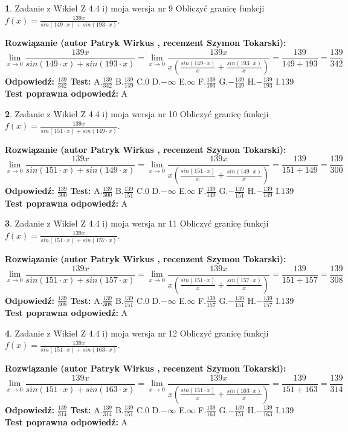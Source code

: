 \documentclass[12pt, a4paper]{article}
\theoremstyle{definition} %
\newtheorem{zad}{}
\newcommand{\zadStart}[1]{\begin{zad}#1\newline}
\newcommand{\zadStop}{\end{zad}}
\newcommand{\rozwStart}[2]{\noindent \textbf{Rozwiązanie (autor #1 , recenzent #2): }\newline}
\newcommand{\rozwStop}{\newline}
\newcommand{\odpStart}{\noindent \textbf{Odpowiedź:}\newline}
\newcommand{\odpStop}{\newline}
\newcommand{\testStart}{\noindent \textbf{Test:}\newline}
\newcommand{\testStop}{\newline}
\newcommand{\kluczStart}{\noindent \textbf{Test poprawna odpowiedź:}\newline}
\newcommand{\kluczStop}{\newline}
\begin{document}
\zadStart{Zadanie z Wikieł Z 4.4 i) moja wersja nr 9}
Obliczyć granicę funkcji $f(x)=\frac{139x}{sin(149\cdot x) +sin(193\cdot x)}$.
\zadStop
\rozwStart{Patryk Wirkus}{Szymon Tokarski}
$$\lim\limits_{x\to 0}\frac{139x}{sin(149\cdot x) +sin(193\cdot x)}=\lim\limits_{x\to 0}\frac{139x}{x(\frac{sin(149\cdot x)}{x}+\frac{sin(193\cdot x)}{x})}=\frac{139}{149+193} = \frac{139}{342}$$
\rozwStop
\odpStart
$\frac{139}{342}$
\odpStop
\testStart
A.$\frac{139}{342}$
B.$\frac{139}{149}$
C.$0$
D.$-\infty$
E.$\infty$
F.$\frac{139}{193}$
G.$-\frac{139}{149}$
H.$-\frac{139}{193}$
I.$139$
\testStop
\kluczStart
A
\kluczStop



\zadStart{Zadanie z Wikieł Z 4.4 i) moja wersja nr 10}
Obliczyć granicę funkcji $f(x)=\frac{139x}{sin(151\cdot x) +sin(149\cdot x)}$.
\zadStop
\rozwStart{Patryk Wirkus}{Szymon Tokarski}
$$\lim\limits_{x\to 0}\frac{139x}{sin(151\cdot x) +sin(149\cdot x)}=\lim\limits_{x\to 0}\frac{139x}{x(\frac{sin(151\cdot x)}{x}+\frac{sin(149\cdot x)}{x})}=\frac{139}{151+149} = \frac{139}{300}$$
\rozwStop
\odpStart
$\frac{139}{300}$
\odpStop
\testStart
A.$\frac{139}{300}$
B.$\frac{139}{151}$
C.$0$
D.$-\infty$
E.$\infty$
F.$\frac{139}{149}$
G.$-\frac{139}{151}$
H.$-\frac{139}{149}$
I.$139$
\testStop
\kluczStart
A
\kluczStop



\zadStart{Zadanie z Wikieł Z 4.4 i) moja wersja nr 11}
Obliczyć granicę funkcji $f(x)=\frac{139x}{sin(151\cdot x) +sin(157\cdot x)}$.
\zadStop
\rozwStart{Patryk Wirkus}{Szymon Tokarski}
$$\lim\limits_{x\to 0}\frac{139x}{sin(151\cdot x) +sin(157\cdot x)}=\lim\limits_{x\to 0}\frac{139x}{x(\frac{sin(151\cdot x)}{x}+\frac{sin(157\cdot x)}{x})}=\frac{139}{151+157} = \frac{139}{308}$$
\rozwStop
\odpStart
$\frac{139}{308}$
\odpStop
\testStart
A.$\frac{139}{308}$
B.$\frac{139}{151}$
C.$0$
D.$-\infty$
E.$\infty$
F.$\frac{139}{157}$
G.$-\frac{139}{151}$
H.$-\frac{139}{157}$
I.$139$
\testStop
\kluczStart
A
\kluczStop



\zadStart{Zadanie z Wikieł Z 4.4 i) moja wersja nr 12}
Obliczyć granicę funkcji $f(x)=\frac{139x}{sin(151\cdot x) +sin(163\cdot x)}$.
\zadStop
\rozwStart{Patryk Wirkus}{Szymon Tokarski}
$$\lim\limits_{x\to 0}\frac{139x}{sin(151\cdot x) +sin(163\cdot x)}=\lim\limits_{x\to 0}\frac{139x}{x(\frac{sin(151\cdot x)}{x}+\frac{sin(163\cdot x)}{x})}=\frac{139}{151+163} = \frac{139}{314}$$
\rozwStop
\odpStart
$\frac{139}{314}$
\odpStop
\testStart
A.$\frac{139}{314}$
B.$\frac{139}{151}$
C.$0$
D.$-\infty$
E.$\infty$
F.$\frac{139}{163}$
G.$-\frac{139}{151}$
H.$-\frac{139}{163}$
I.$139$
\testStop
\kluczStart
A
\kluczStop
\end{document}
